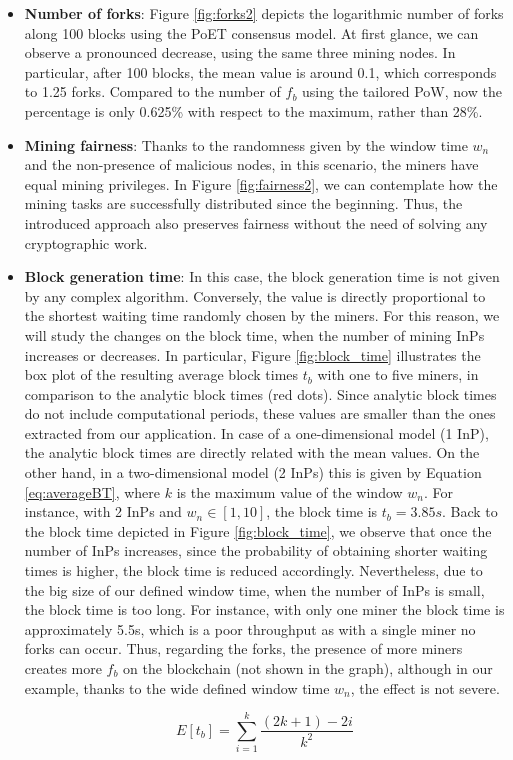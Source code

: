 \begin{itemize}
\item \textbf{Number of forks}: Figure \ref{fig:forks2} depicts the logarithmic number of forks along 100 blocks using the PoET consensus model. At first glance, we can observe a pronounced decrease, using the same three mining nodes. In particular, after 100 blocks, the mean value is around 0.1, which corresponds to 1.25 forks. Compared to the number of $f_b$ using the tailored PoW, now the percentage is only 0.625\% with respect to the maximum, rather than 28\%.
\item \textbf{Mining fairness}: Thanks to the randomness given by the window time $w_n$ and the non-presence of malicious nodes, in this scenario, the miners have equal mining privileges. In Figure \ref{fig:fairness2}, we can contemplate how the mining tasks are successfully distributed since the beginning. Thus, the introduced approach also preserves fairness without the need of solving any cryptographic work.
\item \textbf{Block generation time}: In this case, the block generation time is not given by any complex algorithm. Conversely, the value is directly proportional to the shortest waiting time randomly chosen by the miners. For this reason, we will study the changes on the block time, when the number of mining InPs increases or decreases. In particular, Figure \ref{fig:block_time} illustrates the box plot of the resulting average block times $t_b$ with one to five miners, in comparison to the analytic block times (red dots). Since analytic block times do not include computational periods, these values are smaller than the ones extracted from our application. In case of a one-dimensional model (1 InP), the analytic block times are directly related with the mean values. On the other hand, in a two-dimensional model (2 InPs) this is given by Equation \ref{eq:averageBT}, where $k$ is the maximum value of the window $w_n$. For instance, with 2 InPs and $w_n \in [1,10]$, the block time is $t_b = 3.85s$. Back to the block time depicted in Figure \ref{fig:block_time}, we observe that once the number of InPs increases, since the probability of obtaining shorter waiting times is higher, the block time is reduced accordingly. Nevertheless, due to the big size of our defined window time, when the number of InPs is small, the block time is too long. For instance, with only one miner the block time is approximately 5.5s, which is a poor throughput as with a single miner no forks can occur.
Thus, regarding the forks, the presence of more miners creates more $f_b$ on the blockchain (not shown in the graph), although in our example, thanks to the wide defined window time $w_n$, the effect is not severe.

  \begin{equation} \label{eq:averageBT}
 E [t_b] = \sum_{i = 1}^{k} \frac{(2k + 1)-2i}{k^2}  
  \end{equation}
  
\end{itemize}

